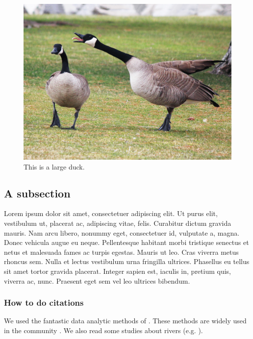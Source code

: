 \documentclass[twocolumn, switch]{article} %
\begin{document}
\begin{figure}[t]
  \centering
  \includegraphics[scale=0.2]{goose.jpg}
  \caption{This is a large duck.}
  \label{fig:fig2}
\end{figure}

\subsection{A subsection}

Lorem ipsum dolor sit amet, consectetuer adipiscing elit. Ut purus elit, vestibulum ut, placerat ac, adipiscing vitae, felis. Curabitur dictum gravida mauris. Nam arcu libero, nonummy eget, consectetuer id, vulputate a, magna. Donec vehicula augue eu neque. Pellentesque habitant morbi tristique senectus et netus et malesuada fames ac turpis egestas. Mauris ut leo. Cras viverra metus rhoncus sem. Nulla et lectus vestibulum urna fringilla ultrices. Phasellus eu tellus sit amet tortor gravida placerat. Integer sapien est, iaculis in, pretium quis, viverra ac, nunc. Praesent eget sem vel leo ultrices bibendum.

\subsubsection{How to do citations}

We used the fantastic data analytic methods of \textcite{aitchison_statistical_1986}. These methods are widely used in the community \autocite{von_eynatten_sediment_2016}. We also read some studies about rivers (e.g. \cite{roberts_estimating_2010}). 
\end{document}
